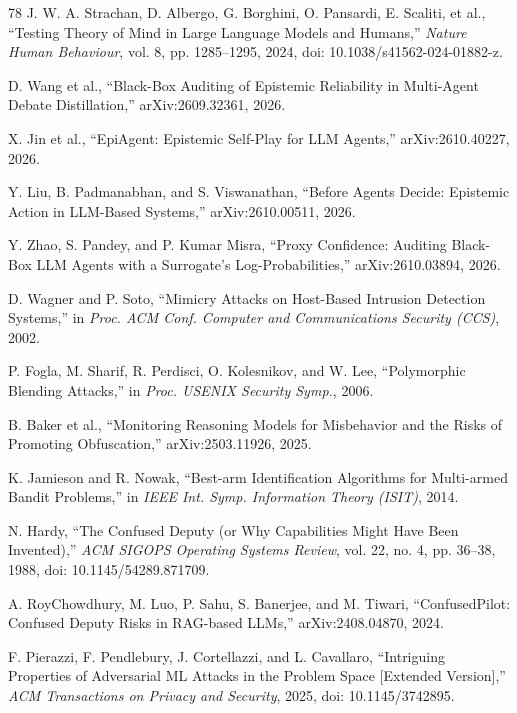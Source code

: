 \begin{thebibliography}{78}
J. W. A. Strachan, D. Albergo, G. Borghini, O. Pansardi, E. Scaliti, et al.,
``Testing Theory of Mind in Large Language Models and Humans,'' \emph{Nature
Human Behaviour}, vol. 8, pp. 1285--1295, 2024, doi:
10.1038/s41562-024-01882-z.

D. Wang et al., ``Black-Box Auditing of Epistemic Reliability in Multi-Agent
Debate Distillation,'' arXiv:2609.32361, 2026.

X. Jin et al., ``EpiAgent: Epistemic Self-Play for LLM Agents,''
arXiv:2610.40227, 2026.

Y. Liu, B. Padmanabhan, and S. Viswanathan, ``Before Agents Decide: Epistemic
Action in LLM-Based Systems,'' arXiv:2610.00511, 2026.

Y. Zhao, S. Pandey, and P. Kumar Misra, ``Proxy Confidence: Auditing Black-Box
LLM Agents with a Surrogate's Log-Probabilities,'' arXiv:2610.03894, 2026.

D. Wagner and P. Soto, ``Mimicry Attacks on Host-Based Intrusion Detection
Systems,'' in \emph{Proc. ACM Conf. Computer and Communications Security
(CCS)}, 2002.

P. Fogla, M. Sharif, R. Perdisci, O. Kolesnikov, and W. Lee, ``Polymorphic
Blending Attacks,'' in \emph{Proc. USENIX Security Symp.}, 2006.

B. Baker et al., ``Monitoring Reasoning Models for Misbehavior and the Risks
of Promoting Obfuscation,'' arXiv:2503.11926, 2025.

K. Jamieson and R. Nowak, ``Best-arm Identification Algorithms for
Multi-armed Bandit Problems,'' in \emph{IEEE Int. Symp. Information Theory
(ISIT)}, 2014.

N. Hardy, ``The Confused Deputy (or Why Capabilities Might Have Been
Invented),'' \emph{ACM SIGOPS Operating Systems Review}, vol. 22, no. 4,
pp. 36--38, 1988, doi: 10.1145/54289.871709.

A. RoyChowdhury, M. Luo, P. Sahu, S. Banerjee, and M. Tiwari, ``ConfusedPilot:
Confused Deputy Risks in RAG-based LLMs,'' arXiv:2408.04870, 2024.

F. Pierazzi, F. Pendlebury, J. Cortellazzi, and L. Cavallaro, ``Intriguing
Properties of Adversarial ML Attacks in the Problem Space [Extended
Version],'' \emph{ACM Transactions on Privacy and Security}, 2025, doi:
10.1145/3742895.


\end{thebibliography}
